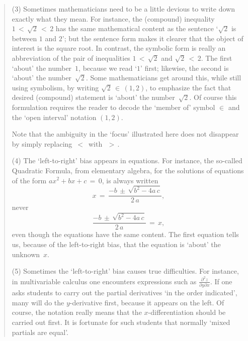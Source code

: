 \begin{quotation}
{        (3) Sometimes mathematicians need to be a little devious to write down exactly what they mean.
    For instance, the (compound) inequality $1\,<\,\sqrt{2}\,<\,2$ has the same mathematical content as the sentence `$\sqrt{2}$ is between $1$ and $2$';
    but the sentence form makes it clearer that the object of interest is the square root.
    In contrast, the symbolic form is really an abbreviation of the pair of inequalities $1\,<\,\sqrt{2}$ and $\sqrt{2}\,<\,2$.
    The first `about' the number~$1$, because we read `$1$' first; likewise, the second is `about' the number~$\sqrt{2}$.
    Some mathematicians get around this, while still using symbolism, by writing $\sqrt{2}\,{\in}\,(1,2)$,
    to emphasize the fact that desired (compound) statement is `about' the number~$\sqrt{2}$.
    Of course this formulation requires the reader to decode the `member of' symbol ${\in}$ and the `open interval' notation $(1,2)$.

        Note that the ambiguity in the `focus' illustrated here does not disappear by simply replacing $\,<\,$ with~$\,>\,$.

\V

        (4) The `left-to-right' bias appears in equations. For instance, the so-called Quadratic Formula, from elementary algebra, for the solutions of equations of the form $ax^{2}+bx+c \,=\, 0$, is always written
        \begin{displaymath}
        x \,=\, \frac{-b  \,{\pm}\, \sqrt{b^{2} - 4a\,c}}{2\,a},
        \end{displaymath}
    never
        \begin{displaymath}
        \frac{-b  \,{\pm}\, \sqrt{b^{2} - 4a\,c}}{2\,a} \,=\, x,
        \end{displaymath}
    even though the equations have the same content. The first equation tells us,
    because of the left-to-right bias, that the equation is `about' the unknown~$x$.

\V

        (5) Sometimes the `left-to-right' bias causes true difficulties. For instance,
    in multivariable calculus one encounters expressions such as ${\displaystyle \frac{{\partial}^{2}z}{{\partial}y{\partial}x}}$.
    If one asks students to carry out the partial derivatives `in the order indicated',
    many will do the $y$-derivative first, because it appears on the left.
    Of course, the notation really means that the $x$-differentiation should be carried out first.
    It is fortunate for such students that normally `mixed partials are equal'.

}
\end{quotation}
